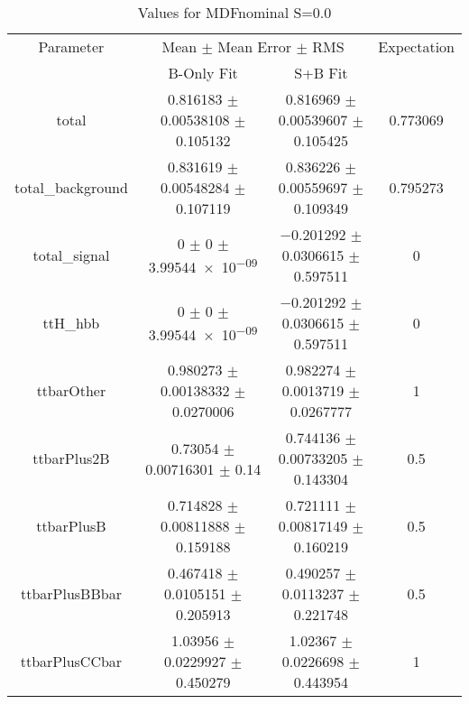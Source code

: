 \begin{table}
\centering
\caption{Values for MDFnominal S=0.0}
\begin{tabular}{cccc}
\toprule
Parameter & \multicolumn{2}{c}{Mean $\pm$ Mean Error $\pm$ RMS} & Expectation\\
 & B-Only Fit & S+B Fit & \\
\midrule
total & \num{0.816183} $\pm$ \num{0.00538108} $\pm$ \num{0.105132} & \num{0.816969} $\pm$ \num{0.00539607} $\pm$ \num{0.105425} & \num{0.773069}\\
total\_background & \num{0.831619} $\pm$ \num{0.00548284} $\pm$ \num{0.107119} & \num{0.836226} $\pm$ \num{0.00559697} $\pm$ \num{0.109349} & \num{0.795273}\\
total\_signal & \num{0} $\pm$ \num{0} $\pm$ \num{3.99544e-09} & \num{-0.201292} $\pm$ \num{0.0306615} $\pm$ \num{0.597511} & \num{0}\\
ttH\_hbb & \num{0} $\pm$ \num{0} $\pm$ \num{3.99544e-09} & \num{-0.201292} $\pm$ \num{0.0306615} $\pm$ \num{0.597511} & \num{0}\\
ttbarOther & \num{0.980273} $\pm$ \num{0.00138332} $\pm$ \num{0.0270006} & \num{0.982274} $\pm$ \num{0.0013719} $\pm$ \num{0.0267777} & \num{1}\\
ttbarPlus2B & \num{0.73054} $\pm$ \num{0.00716301} $\pm$ \num{0.14} & \num{0.744136} $\pm$ \num{0.00733205} $\pm$ \num{0.143304} & \num{0.5}\\
ttbarPlusB & \num{0.714828} $\pm$ \num{0.00811888} $\pm$ \num{0.159188} & \num{0.721111} $\pm$ \num{0.00817149} $\pm$ \num{0.160219} & \num{0.5}\\
ttbarPlusBBbar & \num{0.467418} $\pm$ \num{0.0105151} $\pm$ \num{0.205913} & \num{0.490257} $\pm$ \num{0.0113237} $\pm$ \num{0.221748} & \num{0.5}\\
ttbarPlusCCbar & \num{1.03956} $\pm$ \num{0.0229927} $\pm$ \num{0.450279} & \num{1.02367} $\pm$ \num{0.0226698} $\pm$ \num{0.443954} & \num{1}\\
\bottomrule
\end{tabular}
\end{table}